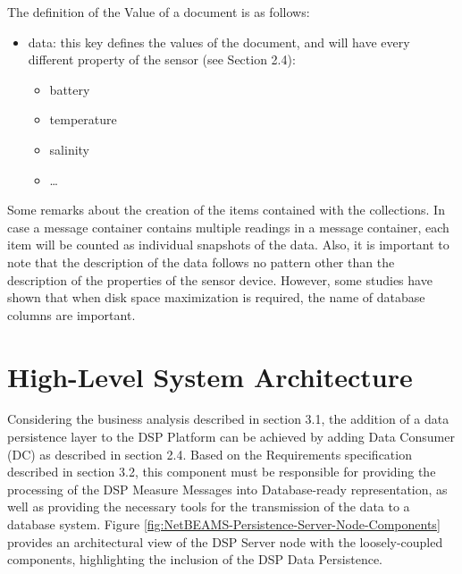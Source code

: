 The definition of the Value of a document is as follows:

\begin{itemize}
  \item data: this key defines the values of the document, and will have every
  different property of the sensor (see Section 2.4):
   \begin{itemize}
     \item battery
     \item temperature
     \item salinity
     \item \ldots
   \end{itemize}
\end{itemize}

Some remarks about the creation of the items contained with the collections. In
case a message container contains multiple readings in a message container,
each item will be counted as individual snapshots of the data. Also, it is
important to note that the description of the data follows no pattern other
than the description of the properties of the sensor device. However, some
studies have shown that when disk space maximization is required, the name of
database columns are important.

\section{High-Level System Architecture}

Considering the business analysis described in section 3.1, the addition of a
data persistence layer to the DSP Platform can be achieved by adding Data
Consumer (DC) as described in section 2.4. Based on the Requirements
specification described in section 3.2, this component must be responsible for
providing the processing of the DSP Measure Messages into Database-ready
representation, as well as providing the necessary tools for the transmission
of the data to a database system. Figure
\ref{fig:NetBEAMS-Persistence-Server-Node-Components} provides an
architectural view of the DSP Server node with the loosely-coupled components,
highlighting the inclusion of the DSP Data Persistence.

